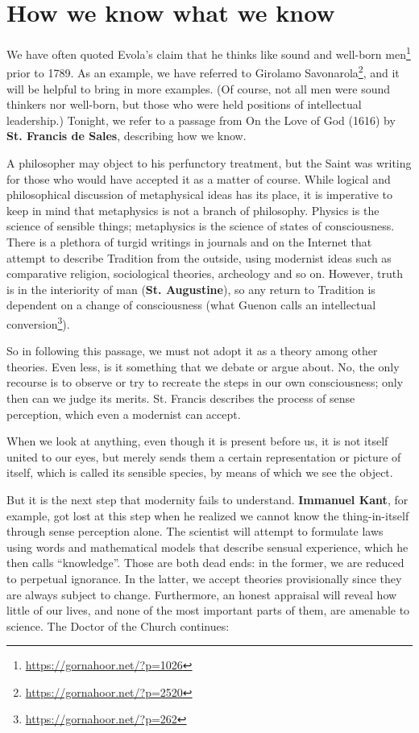 \section{How we know what we know}

We have often quoted Evola's claim that he thinks like sound and well-born men\footnote{\url{https://gornahoor.net/?p=1026}} prior to 1789. As an example, we have referred to Girolamo Savonarola\footnote{\url{https://gornahoor.net/?p=2520}}, and it will be helpful to bring in more examples. (Of course, not all men were sound thinkers nor well-born, but those who were held positions of intellectual leadership.) Tonight, we refer to a passage from On the Love of God (1616) by \textbf{St. Francis de Sales}, describing how we know.

A philosopher may object to his perfunctory treatment, but the Saint was writing for those who would have accepted it as a matter of course. While logical and philosophical discussion of metaphysical ideas has its place, it is imperative to keep in mind that metaphysics is not a branch of philosophy. Physics is the science of sensible things; metaphysics is the science of states of consciousness. There is a plethora of turgid writings in journals and on the Internet that attempt to describe Tradition from the outside, using modernist ideas such as comparative religion, sociological theories, archeology and so on. However, truth is in the interiority of man (\textbf{St. Augustine}), so any return to Tradition is dependent on a change of consciousness (what Guenon calls an intellectual conversion\footnote{\url{https://gornahoor.net/?p=262}}).

So in following this passage, we must not adopt it as a theory among other theories. Even less, is it something that we debate or argue about. No, the only recourse is to observe or try to recreate the steps in our own consciousness; only then can we judge its merits. St. Francis describes the process of sense perception, which even a modernist can accept.

\begin{quotex}
When we look at anything, even though it is present before us, it is not itself united to our eyes, but merely sends them a certain representation or picture of itself, which is called its sensible species, by means of which we see the object.
\end{quotex}

But it is the next step that modernity fails to understand. \textbf{Immanuel Kant}, for example, got lost at this step when he realized we cannot know the thing-in-itself through sense perception alone. The scientist will attempt to formulate laws using words and mathematical models that describe sensual experience, which he then calls ``knowledge''. Those are both dead ends: in the former, we are reduced to perpetual ignorance. In the latter, we accept theories provisionally since they are always subject to change. Furthermore, an honest appraisal will reveal how little of our lives, and none of the most important parts of them, are amenable to science. The Doctor of the Church continues:

